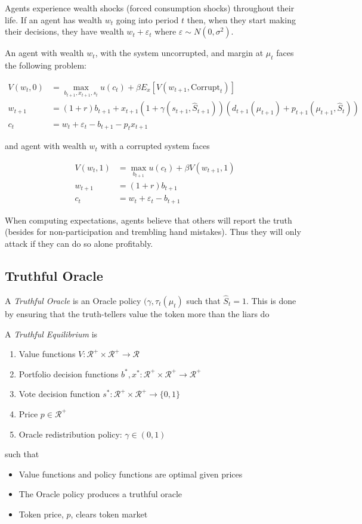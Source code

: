 \documentclass[12pt]{article}
\begin{document}
    Agents experience wealth shocks (forced consumption shocks) throughout their life. If an agent
    has wealth $w_{t}$ going into period $t$ then, when they start making their decisions, they have
    wealth $w_t + \varepsilon_{t}$ where $\varepsilon \sim N(0, \sigma^2)$.

    An agent with wealth $w_t$, with the system uncorrupted, and margin at $\mu_t$ faces the
    following problem:

    \begin{align}
      V(w_t, 0) &= \max_{b_{t+1}, x_{t+1}, s_{t}} u(c_t) + \beta E_x \left[ V(w_{t+1}, \text{Corrupt}_t) \right] \\
      w_{t+1} &= (1 + r) b_{t+1} + x_{t+1} (1 + \gamma(s_{t+1}, \hat{S}_{t+1})) (d_{t+1}(\mu_{t+1}) + p_{t+1}(\mu_{t+1}, \hat{S}_t)) \\
      c_t &= w_t + \varepsilon_t - b_{t+1} - p_t x_{t+1}
    \end{align}

    and agent with wealth $w_t$ with a corrupted system faces

    \begin{align*}
      V(w_t, 1) &= \max_{b_{t+1}} u(c_t) + \beta V(w_{t+1}, 1) \\
      w_{t+1} &= (1 + r) b_{t+1} \\
      c_t &= w_t + \varepsilon_t - b_{t+1}
    \end{align*}

    When computing expectations, agents believe that others will report the truth (besides for
    non-participation and trembling hand mistakes). Thus they will only attack if they can do so alone
    profitably.

  \subsection{Truthful Oracle}

    A \textit{Truthful Oracle} is an Oracle policy $(\gamma, \tau_t(\mu_t)$ such that
    $\hat{S}_t = 1$. This is done by ensuring that the truth-tellers value the token more than the
    liars do

    A \textit{Truthful Equilibrium} is

    \begin{enumerate}
      \item Value functions $V : \mathcal{R}^+ \times \mathcal{R}^+ \rightarrow \mathcal{R}$
      \item Portfolio decision functions $b^*, x^* : \mathcal{R}^+ \times \mathcal{R}^+ \rightarrow \mathcal{R}^{+}$
      \item Vote decision function $s^*: \mathcal{R}^+ \times \mathcal{R}^+ \rightarrow \{0, 1 \}$
      \item Price $p \in \mathcal{R}^+$
      \item Oracle redistribution policy: $\gamma \in (0, 1)$
    \end{enumerate}

    such that

    \begin{itemize}
      \item Value functions and policy functions are optimal given prices
      \item The Oracle policy produces a truthful oracle
      \item Token price, $p$, clears token market
    \end{itemize}
\end{document}
